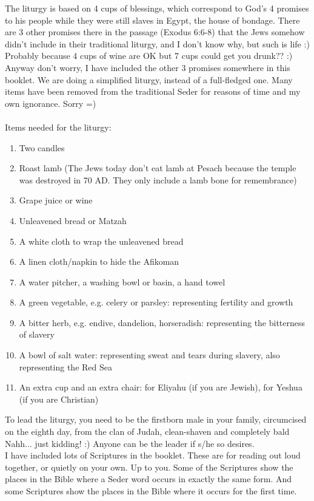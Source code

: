 \documentclass[10pt,oneside,footinclude=true,headinclude=true]{scrbook} %
\begin{document}
The liturgy is based on 4 cups of blessings, which correspond to God's 4 promises to his people while they were still slaves in Egypt, the house of bondage. There are 3 other promises there in the passage (Exodus 6:6-8) that the Jews somehow didn't include in their traditional liturgy, and I don't know why, but such is life :) Probably because 4 cups of wine are OK but 7 cups could get you drunk?? :) Anyway don't worry, I have included the other 3 promises somewhere in this booklet. We are doing a simplified liturgy, instead of a full-fledged one. Many items have been removed from the traditional Seder for reasons of time and my own ignorance. Sorry =)\\
\\
Items needed for the liturgy:
\begin{enumerate}
	\item{Two candles}
	\item{Roast lamb (The Jews today don't eat lamb at Pesach because the temple was destroyed in 70 AD. They only include a lamb bone for remembrance)}
	\item{Grape juice or wine}
	\item{Unleavened bread or Matzah}
	\item{A white cloth to wrap the unleavened bread}
	\item{A linen cloth/napkin to hide the Afikoman}
	\item{A water pitcher, a washing bowl or basin, a hand towel}
	\item{A green vegetable, e.g. celery or parsley: representing fertility and growth}
	\item{A bitter herb, e.g. endive, dandelion, horseradish: representing the bitterness of slavery}
	\item{A bowl of salt water: representing sweat and tears during slavery, also representing the Red Sea}
	\item{An extra cup and an extra chair: for Eliyahu (if you are Jewish), for Yeshua (if you are Christian)}
\end{enumerate}

\vspace{5mm}

To lead the liturgy, you need to be the firstborn male in your family, circumcised on the eighth day, from the clan of Judah, clean-shaven and completely bald Nahh... just kidding! :) Anyone can be the leader if s/he so desires.\\

I have included lots of Scriptures in the booklet. These are for reading out loud together, or quietly on your own. Up to you. Some of the Scriptures show the places in the Bible where a Seder word occurs in exactly the same form. And some Scriptures show the places in the Bible where it occurs for the first time.\\
\end{document}
